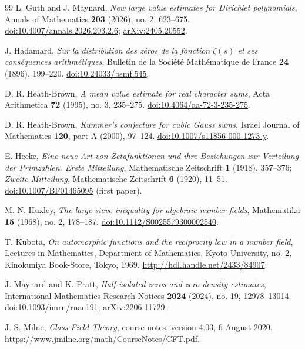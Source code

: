 \documentclass[11pt,a4paper]{article}
\numberwithin{equation}{section}
\numberwithin{figure}{section}
\theoremstyle{definition}
\theoremstyle{remark}
\begin{document}
\begin{thebibliography}{99}
L. Guth and J. Maynard,
\emph{New large value estimates for Dirichlet polynomials},
Annals of Mathematics \textbf{203} (2026), no. 2, 623--675.
\href{https://doi.org/10.4007/annals.2026.203.2.6}{doi:10.4007/annals.2026.203.2.6};
\href{https://arxiv.org/abs/2405.20552}{arXiv:2405.20552}.

J. Hadamard,
\emph{Sur la distribution des z\'eros de la fonction $\zeta(s)$ et ses
cons\'equences arithm\'etiques},
Bulletin de la Soci\'et\'e Math\'ematique de France \textbf{24} (1896),
199--220.
\href{https://doi.org/10.24033/bsmf.545}{doi:10.24033/bsmf.545}.

D. R. Heath-Brown,
\emph{A mean value estimate for real character sums},
Acta Arithmetica \textbf{72} (1995), no. 3, 235--275.
\href{https://doi.org/10.4064/aa-72-3-235-275}{doi:10.4064/aa-72-3-235-275}.

D. R. Heath-Brown,
\emph{Kummer's conjecture for cubic Gauss sums},
Israel Journal of Mathematics \textbf{120}, part A (2000), 97--124.
\href{https://doi.org/10.1007/s11856-000-1273-y}{doi:10.1007/s11856-000-1273-y}.

E. Hecke,
\emph{Eine neue Art von Zetafunktionen und ihre Beziehungen zur
Verteilung der Primzahlen. Erste Mitteilung},
Mathematische Zeitschrift \textbf{1} (1918), 357--376;
\emph{Zweite Mitteilung}, Mathematische Zeitschrift \textbf{6} (1920),
11--51.
\href{https://doi.org/10.1007/BF01465095}{doi:10.1007/BF01465095}
(first paper).

M. N. Huxley,
\emph{The large sieve inequality for algebraic number fields},
Mathematika \textbf{15} (1968), no. 2, 178--187.
\href{https://doi.org/10.1112/S0025579300002540}{doi:10.1112/S0025579300002540}.

T. Kubota,
\emph{On automorphic functions and the reciprocity law in a number field},
Lectures in Mathematics, Department of Mathematics, Kyoto University,
no. 2, Kinokuniya Book-Store, Tokyo, 1969.
\url{http://hdl.handle.net/2433/84907}.

J. Maynard and K. Pratt,
\emph{Half-isolated zeros and zero-density estimates},
International Mathematics Research Notices \textbf{2024} (2024), no. 19,
12978--13014.
\href{https://doi.org/10.1093/imrn/rnae191}{doi:10.1093/imrn/rnae191};
\href{https://arxiv.org/abs/2206.11729}{arXiv:2206.11729}.

J. S. Milne,
\emph{Class Field Theory}, course notes, version 4.03, 6 August 2020.
\url{https://www.jmilne.org/math/CourseNotes/CFT.pdf}.


\end{thebibliography}
\end{document}
